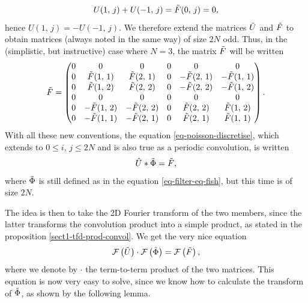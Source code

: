 \begin{equation*}
U (1, \, j) + U (-1, \, j) = \tilde{F} (0, \, j) = 0,
\end{equation*}
hence $ U (1, \, j) = - U (-1, \, j) $. We therefore extend the matrices $ \tilde{U} $ and $ \tilde{F} $ to obtain matrices (always noted in the same way) of size $ 2 N $ odd. Thus, in the (simplistic, but instructive) case where $ N = 3 $, the matrix $ \tilde{F} $ will be written
\begin{equation*}
\tilde{F} = \begin{pmatrix} 0 & 0 & 0 & 0 & 0 & 0 \\0 & \tilde{F} (1, \, 1) & \tilde{F} (2, \, 1 ) & 0 & - \tilde{F} (2, \, 1) & - \tilde{F} (1, \, 1) \\0 & \tilde{F} (1, \, 2) & \tilde{F} (2, \, 2) & 0 & - \tilde{F} (2, \, 2) & - \tilde{F} (1, \, 2) \\0 & 0 & 0 & 0 & 0 & 0 \\0 & - \tilde{F} (1, \, 2) & - \tilde{F} (2, \, 2) & 0 & \tilde{F} (2, \, 2) & \tilde{F} (1, \, 2) \\0 & - \tilde{F} (1, \, 1) & - \tilde{F} (2, \, 1) & 0 & \tilde{F} (2, \, 1) & \tilde{F} (1, \, 1) \\\end{pmatrix}.
\end{equation*}
With all these new conventions, the equation \eqref{eq-poisson-discretise}, which extends to $ 0 \leq i, \, j \leq 2N $ and is also true as a periodic convolution, is written
\begin{equation*}
\hat{U} * \tilde{\Phi} = \tilde{F},
\end{equation*}
where $ \tilde{\Phi} $ is still defined as in the equation \eqref{eq-filter-eq-fish}, but this time is of size $ 2 N $.
 
 
The idea is then to take the 2D Fourier transform of the two members, since the latter transforms the convolution product into a simple product, as stated in the proposition \ref{sect1-tfd-prod-convol}. We get the very nice equation
\begin{equation*}
\mathcal{F} \left(\tilde{U} \right) \cdot \mathcal{F} \left(\tilde{\Phi} \right) = \mathcal{F} \left(\tilde{F} \right),
\end{equation*}
where we denote by $ \cdot $ the term-to-term product of the two matrices. This equation is now very easy to solve, since we know how to calculate the transform of $ \tilde{\Phi} $, as shown by the following lemma.
 
